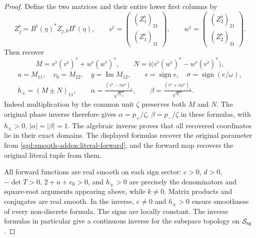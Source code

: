 \begin{proof}
Define the two matrices and their entire lower first columns by
\[
 Z_j^\flat=B^\flat(\eta)^*Z_{j,0}B^\flat(\eta),\qquad
 v^\flat=\begin{pmatrix}(Z_1^\flat)_{21}\\(Z_1^\flat)_{31}\end{pmatrix},
 \qquad
 w^\flat=\begin{pmatrix}(Z_2^\flat)_{21}\\(Z_2^\flat)_{31}\end{pmatrix}.
\]
Then recover
\[
 M=v^\flat(v^\flat)^*+w^\flat(w^\flat)^*,\qquad
 N=i\bigl(v^\flat(w^\flat)^*-w^\flat(v^\flat)^*\bigr),
\]
\begin{equation}
 \begin{gathered}
 u=M_{11},\quad v_0=M_{22},\quad y=\operatorname{Im}M_{12},
 \qquad \epsilon=\operatorname{sign}e,\quad
 \sigma=\operatorname{sign}(e/\omega),\\
 h_\pm=(M\pm N)_{11},\qquad
 \alpha=\frac{(v^\flat-iw^\flat)_1}{\sqrt{h_+}},\qquad
 \beta=\frac{(v^\flat+iw^\flat)_1}{\sqrt{h_-}}.
 \end{gathered}
 \label{sgd:smooth-addon:literal-spatial-inverse}
\end{equation}
Indeed multiplication by the common unit $\zeta$ preserves both
$M$ and $N$. The original phase inverse therefore gives
$\alpha=p_+/\zeta$, $\beta=p_-/\zeta$ in these formulas, with
$h_\pm>0$, $|\alpha|=|\beta|=1$.
The algebraic inverse proves that all recovered coordinates lie in
their exact domains. The displayed formulas recover the original
parameter from \eqref{sgd:smooth-addon:literal-forward}, and the
forward map recovers the original literal tuple from them.

All forward functions are real smooth on each sign sector:
$c>0$, $d>0$, $-\det T>0$, $2+u+v_0>0$, and $h_\pm>0$
are precisely the denominators and square-root arguments appearing
above, while $k\ne0$. Matrix products and conjugates are real smooth.
In the inverse, $e\ne0$ and $h_\pm>0$ ensure smoothness of every
non-discrete formula. The signs are locally constant.
The inverse formulas in particular give a continuous inverse for
the subspace topology on $\mathcal S_{\rm sg}$.


\end{proof}
